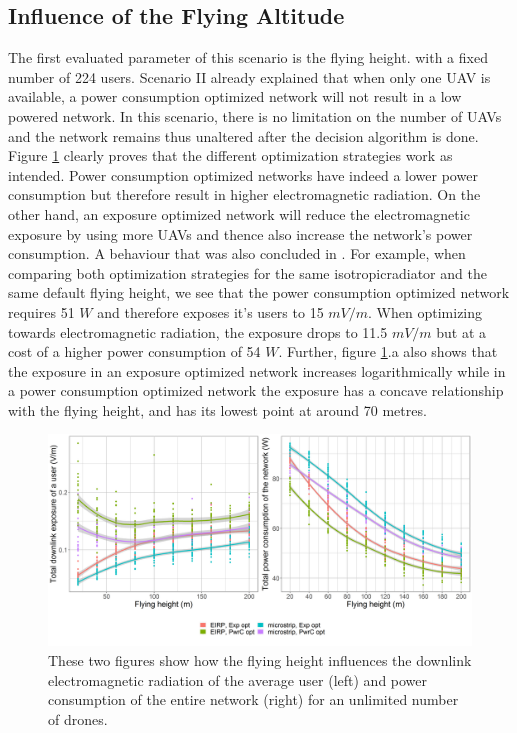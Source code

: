 \subsection{Influence of the Flying Altitude}
\label{S3A}

The first evaluated parameter of this scenario is the flying height. 
with a fixed number of 224 users.
Scenario II already explained that when only one \gls{UAV} is available, a power consumption optimized network will not result in a low 
powered network. In this scenario, there is no limitation on the number of \gls{UAV}s and the network remains thus unaltered after the decision 
algorithm is done. Figure \ref{fig:s3a_dlAndPc} clearly proves that the different optimization strategies work as intended.
Power consumption optimized networks have indeed a lower power consumption but therefore result in higher electromagnetic radiation.
On the other hand, an exposure optimized network will reduce the electromagnetic exposure by using more \gls{UAV}s and thence also increase the network's power consumption.
A behaviour that was also concluded in \cite{J1}.
For example, when comparing both optimization strategies for the same \gls{isotropicradiator} and the same default flying height, we see that
the power consumption optimized network requires 51 $W$ and therefore exposes it's users
to 15 $mV/m$. When optimizing towards electromagnetic radiation, the exposure drops to 11.5 $mV/m$ but at a cost of a higher power consumption
of 54 $W$.
Further, figure  \ref{fig:s3a_dlAndPc}.a also shows that the exposure in an exposure optimized network increases logarithmically while in a power consumption optimized network the exposure has a concave relationship with the flying height, and has its lowest point at around 70 metres.


\begin{figure}[h!]
  \includegraphics[width=\textwidth]{../results/s3/fhvsdlAndPc.png}
  \caption{
    These two figures show how the flying height influences the downlink electromagnetic radiation of the average user (left) and 
  power consumption of the entire network (right) for an unlimited number of drones.
  }
     \label{fig:s3a_dlAndPc}
\end{figure}

